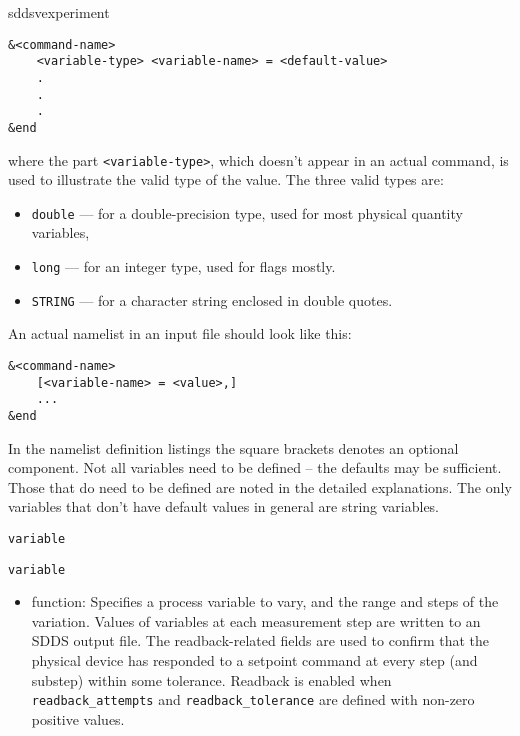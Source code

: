 \begin{sddsprog}{sddsvexperiment}
\begin{itemize}
\begin{verbatim}
&<command-name>
    <variable-type> <variable-name> = <default-value>
    .
    .
    .
&end
\end{verbatim}

where the part \verb+<variable-type>+, which doesn't appear in an
actual command, is used to illustrate the valid type of the value. The
three valid types are:
  \begin{itemize}
    \item \verb+double+ --- for a double-precision type, used for most
   physical quantity variables,
    \item \verb+long+ ---   for an integer type, used for flags mostly.
    \item \verb+STRING+ --- for a character string enclosed in double quotes.
  \end{itemize}
An actual namelist in an input file should look like this:
\begin{verbatim}
&<command-name>
    [<variable-name> = <value>,]
    ...
&end
\end{verbatim}

In the namelist definition listings the square brackets denotes an
optional component.  Not all variables need to be defined -- the
defaults may be sufficient.  Those that do need to be defined are
noted in the detailed explanations.  The only variables that don't
have default values in general are string variables.


\begin{latexonly}
\newpage\begin{center}{\Large \verb+variable+}\end{center}
\end{latexonly}
\begin{htmlonly}
  \item {\Large \verb+variable+}
\end{htmlonly}

  \begin{itemize}
    \item function: Specifies a process variable to vary, and the range
      and steps of the variation.  Values of variables at each
      measurement step are written to an SDDS output file.  The
      readback-related fields are used to confirm that the physical
      device has responded to a setpoint command at every step (and
      substep) within some tolerance. Readback is enabled when
      {\verb+readback_attempts+} and {\verb+readback_tolerance+} are
      defined with non-zero positive values.


\end{itemize}
\end{itemize}
\end{sddsprog}
